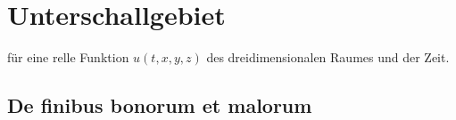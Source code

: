 %
%
%
%
\section{Unterschallgebiet\label{ueberschall:unterschallgebiet}}

für eine relle Funktion $u(t,x,y,z)$ des dreidimensionalen Raumes und der Zeit.

\subsection{De finibus bonorum et 
malorum\label{ueberschall:subsection:finibus}}

